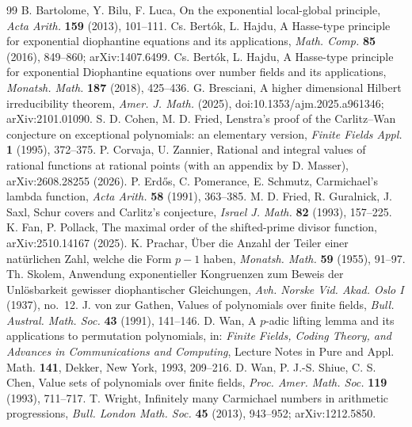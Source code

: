 \documentclass[11pt]{amsart}
\theoremstyle{definition}
\theoremstyle{remark}
\begin{document}
\begin{thebibliography}{99}
 B. Bartolome, Y. Bilu, F. Luca, On the exponential local-global principle, \emph{Acta Arith.} \textbf{159} (2013), 101--111.
 Cs. Bert\'ok, L. Hajdu, A Hasse-type principle for exponential diophantine equations and its applications, \emph{Math. Comp.} \textbf{85} (2016), 849--860; arXiv:1407.6499.
 Cs. Bert\'ok, L. Hajdu, A Hasse-type principle for exponential Diophantine equations over number fields and its applications, \emph{Monatsh. Math.} \textbf{187} (2018), 425--436.
 G. Bresciani, A higher dimensional Hilbert irreducibility theorem, \emph{Amer. J. Math.} (2025), doi:10.1353/ajm.2025.a961346; arXiv:2101.01090.
 S. D. Cohen, M. D. Fried, Lenstra's proof of the Carlitz--Wan conjecture on exceptional polynomials: an elementary version, \emph{Finite Fields Appl.} \textbf{1} (1995), 372--375.
 P. Corvaja, U. Zannier, Rational and integral values of rational functions at rational points (with an appendix by D. Masser), arXiv:2608.28255 (2026).
 P. Erd\H{o}s, C. Pomerance, E. Schmutz, Carmichael's lambda function, \emph{Acta Arith.} \textbf{58} (1991), 363--385.
 M. D. Fried, R. Guralnick, J. Saxl, Schur covers and Carlitz's conjecture, \emph{Israel J. Math.} \textbf{82} (1993), 157--225.
 K. Fan, P. Pollack, The maximal order of the shifted-prime divisor function, arXiv:2510.14167 (2025).
 K. Prachar, \"Uber die Anzahl der Teiler einer nat\"urlichen Zahl, welche die Form $p-1$ haben, \emph{Monatsh. Math.} \textbf{59} (1955), 91--97.
 Th. Skolem, Anwendung exponentieller Kongruenzen zum Beweis der Unl\"osbarkeit gewisser diophantischer Gleichungen, \emph{Avh. Norske Vid. Akad. Oslo I} (1937), no.~12.
 J. von zur Gathen, Values of polynomials over finite fields, \emph{Bull. Austral. Math. Soc.} \textbf{43} (1991), 141--146.
 D. Wan, A $p$-adic lifting lemma and its applications to permutation polynomials, in: \emph{Finite Fields, Coding Theory, and Advances in Communications and Computing}, Lecture Notes in Pure and Appl. Math. \textbf{141}, Dekker, New York, 1993, 209--216.
 D. Wan, P. J.-S. Shiue, C. S. Chen, Value sets of polynomials over finite fields, \emph{Proc. Amer. Math. Soc.} \textbf{119} (1993), 711--717.
 T. Wright, Infinitely many Carmichael numbers in arithmetic progressions, \emph{Bull. London Math. Soc.} \textbf{45} (2013), 943--952; arXiv:1212.5850.
\end{thebibliography}
\end{document}
